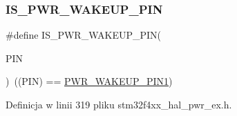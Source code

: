 \subsubsection{\texorpdfstring{I\+S\+\_\+\+P\+W\+R\+\_\+\+W\+A\+K\+E\+U\+P\+\_\+\+P\+IN}{IS\_PWR\_WAKEUP\_PIN}}
{\footnotesize\ttfamily \#define I\+S\+\_\+\+P\+W\+R\+\_\+\+W\+A\+K\+E\+U\+P\+\_\+\+P\+IN(\begin{DoxyParamCaption}\item[{}]{P\+IN }\end{DoxyParamCaption})~((P\+IN) == \hyperlink{group___p_w_r___wake_up___pins_ga0da8e7cbe0826e93b777ae4419a1cd05}{P\+W\+R\+\_\+\+W\+A\+K\+E\+U\+P\+\_\+\+P\+I\+N1})}



Definicja w linii 319 pliku stm32f4xx\+\_\+hal\+\_\+pwr\+\_\+ex.\+h.

